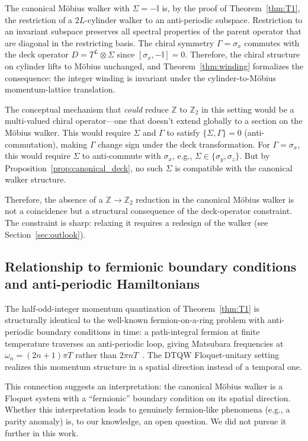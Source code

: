 \documentclass[aps,pra,reprint,amsmath,amssymb,superscriptaddress,nofootinbib,longbibliography]{revtex4-2}
\newcommand{\Z}{\mathbb{Z}}
\newcommand{\I}{\mathbb{I}}
\newcommand{\sigx}{\sigma_x}
\newcommand{\sigy}{\sigma_y}
\newcommand{\sigz}{\sigma_z}
\begin{document}
The canonical M\"obius walker with $\Sigma = -\I$ is, by the proof of Theorem~\ref{thm:T1}, the restriction of a $2L$-cylinder walker to an anti-periodic subspace. Restriction to an invariant subspace preserves all spectral properties of the parent operator that are diagonal in the restricting basis. The chiral symmetry $\Gamma = \sigx$ commutes with the deck operator $D = T^L \otimes \Sigma$ since $[\sigx, -\I] = 0$. Therefore, the chiral structure on cylinder lifts to M\"obius unchanged, and Theorem~\ref{thm:winding} formalizes the consequence: the integer winding is invariant under the cylinder-to-M\"obius momentum-lattice translation.

The conceptual mechanism that \emph{could} reduce $\Z$ to $\Z_2$ in this setting would be a multi-valued chiral operator---one that doesn't extend globally to a section on the M\"obius walker. This would require $\Sigma$ and $\Gamma$ to satisfy $\{\Sigma, \Gamma\} = 0$ (anti-commutation), making $\Gamma$ change sign under the deck transformation. For $\Gamma = \sigx$, this would require $\Sigma$ to anti-commute with $\sigx$, e.g., $\Sigma \in \{\sigy, \sigz\}$. But by Proposition~\ref{prop:canonical_deck}, no such $\Sigma$ is compatible with the canonical walker structure.

Therefore, the absence of a $\Z \to \Z_2$ reduction in the canonical M\"obius walker is not a coincidence but a structural consequence of the deck-operator constraint. The constraint is sharp: relaxing it requires a redesign of the walker (see Section~\ref{sec:outlook}).

\subsection{Relationship to fermionic boundary conditions and anti-periodic Hamiltonians}

The half-odd-integer momentum quantization of Theorem~\ref{thm:T1} is structurally identical to the well-known fermion-on-a-ring problem with anti-periodic boundary conditions in time: a path-integral fermion at finite temperature traverses an anti-periodic loop, giving Matsubara frequencies at $\omega_n = (2n+1)\pi T$ rather than $2\pi n T$~\cite{matsubara1955}. The DTQW Floquet-unitary setting realizes this momentum structure in a spatial direction instead of a temporal one.

This connection suggests an interpretation: the canonical M\"obius walker is a Floquet system with a ``fermionic'' boundary condition on its spatial direction. Whether this interpretation leads to genuinely fermion-like phenomena (e.g., a parity anomaly) is, to our knowledge, an open question. We did not pursue it further in this work.
\end{document}
